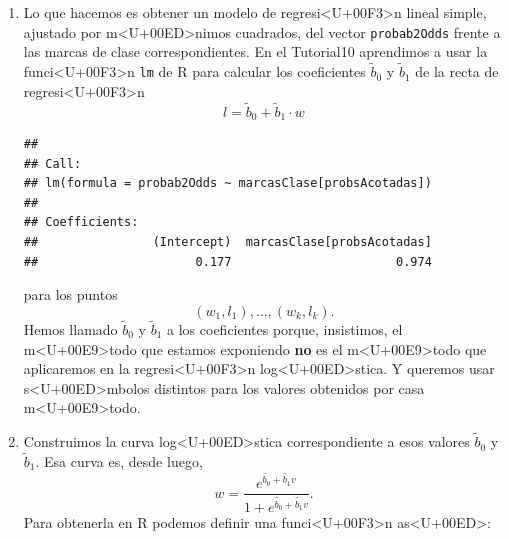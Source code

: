 \documentclass[10pt,a4paper]{article}
\begin{document}
\begin{enumerate}
\item Lo que hacemos es obtener un modelo de regresi<U+00F3>n lineal simple, ajustado por m<U+00ED>nimos cuadrados, del vector {\tt probab2Odds} frente a las marcas de clase correspondientes. En el Tutorial10 aprendimos a usar la funci<U+00F3>n {\tt lm} de R para calcular los coeficientes $\widetilde b_0$ y $\widetilde b_1$ de la recta de regresi<U+00F3>n
\[l = \widetilde b_0 +\widetilde b_1\cdot w\]

\begin{knitrout}
\color{fgcolor}\begin{kframe}
\begin{alltt}
 \hlkwb{=}  \hlopt{~} 
\end{alltt}
\begin{verbatim}
## 
## Call:
## lm(formula = probab2Odds ~ marcasClase[probsAcotadas])
## 
## Coefficients:
##                (Intercept)  marcasClase[probsAcotadas]  
##                      0.177                       0.974
\end{verbatim}
\end{kframe}
\end{knitrout}

para los puntos
\[(w_1,l_1),\ldots,(w_k,l_k).\]
Hemos llamado $\widetilde b_0$ y $\widetilde b_1$ a los coeficientes porque, insistimos, el m<U+00E9>todo que estamos exponiendo {\bf no} es el m<U+00E9>todo que aplicaremos en la regresi<U+00F3>n log<U+00ED>stica. Y queremos usar s<U+00ED>mbolos distintos para los valores obtenidos por casa m<U+00E9>todo.

\item Construimos la curva log<U+00ED>stica correspondiente a esos valores $\widetilde b_0$ y $\widetilde b_1$. Esa curva es, desde luego,
\[
  w = \dfrac{e^{\widetilde{b_0} + \widetilde{b_1} v}}{1 + e^{\widetilde{b_0} + \widetilde{b_1} v}}.
\]
Para obtenerla en R podemos definir una funci<U+00F3>n as<U+00ED>:

\begin{knitrout}
\color{fgcolor}\begin{kframe}
\begin{alltt}
 \hlkwb{=} \hlstd{(}\hlstd{)\{}
   \hlkwb{=} \hlopt{$}\hlstd{coefficients[}\hlstd{]}
   \hlkwb{=} \hlopt{$}\hlstd{coefficients[}\hlstd{]}
  \hlstd{(} \hlopt{+}  \hlopt{*} \hlopt{/}\hlstd{(} \hlopt{+}  \hlopt{+}  \hlopt{*} 
\hlstd{\}}
\end{alltt}
\end{kframe}
\end{knitrout}


\end{enumerate}
\end{document}
